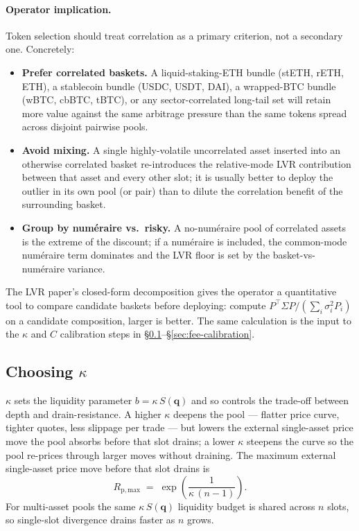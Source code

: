 \documentclass[11pt]{article}
\newcommand{\Sm}{S(\mathbf{q})}
\begin{document}
\paragraph{Operator implication.}
Token selection should treat correlation as a primary criterion, not a
secondary one. Concretely:
\begin{itemize}
  \item \textbf{Prefer correlated baskets.} A liquid-staking-ETH bundle
        (stETH, rETH, ETH), a stablecoin bundle (USDC, USDT, DAI), a
        wrapped-BTC bundle (wBTC, cbBTC, tBTC), or any
        sector-correlated long-tail set will retain more value against
        the same arbitrage pressure than the same tokens spread across
        disjoint pairwise pools.
  \item \textbf{Avoid mixing.} A single highly-volatile uncorrelated
        asset inserted into an otherwise correlated basket re-introduces
        the relative-mode LVR contribution between that asset and every
        other slot; it is usually better to deploy the outlier in its
        own pool (or pair) than to dilute the correlation benefit of the
        surrounding basket.
  \item \textbf{Group by num\'eraire vs.\ risky.} A no-num\'eraire pool
        of correlated assets is the extreme of the discount; if a
        num\'eraire is included, the common-mode num\'eraire term
        dominates and the LVR floor is set by the basket-vs-num\'eraire
        variance.
\end{itemize}
The LVR paper's closed-form decomposition gives the operator a
quantitative tool to compare candidate baskets before deploying: compute
$P^{\!\top}\!\Sigma P / (\sum_i \sigma_i^2 P_i)$ on a candidate
composition, larger is better. The same calculation is the input to the
$\kappa$ and $C$ calibration steps in
\S\ref{sec:kappa}--\S\ref{sec:fee-calibration}.

\subsection{Choosing $\kappa$}
\label{sec:kappa}

$\kappa$ sets the liquidity parameter $b = \kappa\,\Sm$ and so controls
the trade-off between depth and drain-resistance. A higher $\kappa$
deepens the pool --- flatter price curve, tighter quotes, less slippage
per trade --- but lowers the external single-asset price move the pool
absorbs before that slot drains; a lower $\kappa$ steepens the curve so
the pool re-prices through larger moves without draining. The maximum
external single-asset price move before that slot drains is
\begin{equation}
  R_{\mathrm{p,max}} \;=\; \exp\!\left(\frac{1}{\kappa\,(n-1)}\right).
\end{equation}
For multi-asset pools the same $\kappa\,\Sm$ liquidity budget is shared
across $n$ slots, so single-slot divergence drains faster as $n$ grows.
\end{document}
